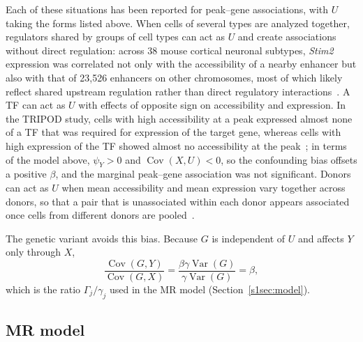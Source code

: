 \noindent Each of these situations has been reported for peak--gene associations, with $U$ taking the forms listed above. When cells of several types are analyzed together, regulators shared by groups of cell types can act as $U$ and create associations without direct regulation: across 38 mouse cortical neuronal subtypes, \textit{Stim2} expression was correlated not only with the accessibility of a nearby enhancer but also with that of 23,526 enhancers on other chromosomes, most of which likely reflect shared upstream regulation rather than direct regulatory interactions~\cite{xie2023robust}. A TF can act as $U$ with effects of opposite sign on accessibility and expression. In the TRIPOD study, cells with high accessibility at a peak expressed almost none of a TF that was required for expression of the target gene, whereas cells with high expression of the TF showed almost no accessibility at the peak~\cite{jiang2022tripod}; in terms of the model above, $\psi_Y>0$ and $\operatorname{Cov}(X,U)<0$, so the confounding bias offsets a positive $\beta$, and the marginal peak--gene association was not significant. Donors can act as $U$ when mean accessibility and mean expression vary together across donors, so that a pair that is unassociated within each donor appears associated once cells from different donors are pooled~\cite{su2025scmultimap}.

\noindent The genetic variant avoids this bias. Because $G$ is independent of $U$ and affects $Y$ only through $X$,
\begin{equation*}
\frac{\operatorname{Cov}(G,Y)}{\operatorname{Cov}(G,X)}
=\frac{\beta\gamma\operatorname{Var}(G)}{\gamma\operatorname{Var}(G)}=\beta,
\end{equation*}
which is the ratio $\Gamma_j/\gamma_j$ used in the MR model (Section~\ref{s1sec:model}).

\subsection*{MR model}
\label{s1sec:model}

